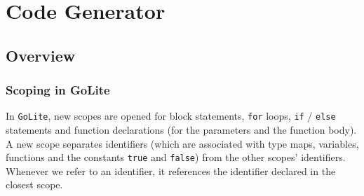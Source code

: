 \documentclass[11pt]{article}
\begin{document}

\section{Code Generator}
\subsection{Overview}
\subsubsection{Scoping in GoLite}
In \texttt{GoLite}, new scopes are opened for block statements,
\texttt{for} loops, \texttt{if} / \texttt{else} statements and
function declarations (for the parameters and the function body). A
new scope separates identifiers (which are associated with type maps,
variables, functions and the constants \texttt{true} and
\texttt{false}) from the other scopes' identifiers. Whenever we refer
to an identifier, it references the identifier declared in the closest
scope.
\end{document}
